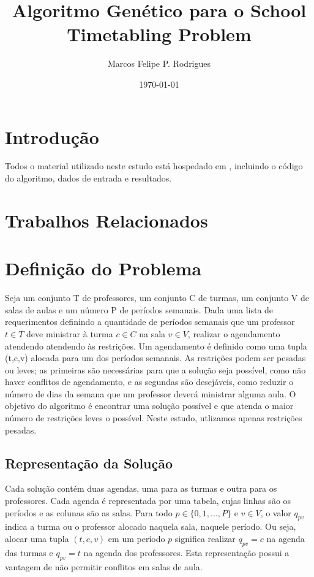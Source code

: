 \documentclass{article}
\title{Algoritmo Genético para o School Timetabling Problem}
\author{Marcos Felipe P. Rodrigues}
\date{\today}
\begin{document}
\maketitle
\text

\section{Introdução}
Todos o material utilizado neste estudo está hospedado em \cite{Github},
incluindo o código do algoritmo, dados de entrada e resultados.

\section{Trabalhos Relacionados}
\section{Definição do Problema}
Seja um conjunto T de professores, um conjunto C de turmas, um conjunto V de
salas de aulas e um número P de períodos semanais. Dada uma lista de
requerimentos definindo a quantidade de períodos semanais que um professor $ t\in T $ 
deve ministrar à turma $ c \in C $ na sala $ v \in V $, realizar o agendamento
atendendo atendendo às restrições. Um agendamento é definido como uma tupla
(t,c,v) alocada para um dos períodos semanais. As restrições podem ser pesadas
ou leves; as primeiras são necessárias para que a solução seja possível, como
não haver conflitos de agendamento, e as segundas são desejáveis, como reduzir o
número de dias da semana que um professor deverá ministrar alguma aula. O
objetivo do algoritmo é encontrar uma solução possível e que atenda o maior
número de restrições leves o possível. Neste estudo, utlizamos apenas restrições
pesadas.

  \subsection{Representação da Solução}
  Cada solução contém duas agendas, uma para as turmas e outra para os
  professores. Cada agenda é representada por uma tabela, cujas linhas são os
  períodos e as colunas são as salas. Para todo $ p \in \{0,1,...,P\} $ e 
  $ v \in V $, o valor $ q_{pv} $ indica a turma ou o professor alocado
  naquela sala, naquele período. Ou seja, alocar uma tupla $ (t,c,v) $ em um período
  $ p $ significa realizar $ q_{pv} = c $ na agenda das turmas e
  $ q_{pv} = t $ na agenda dos professores. Esta representação possui a
  vantagem de não permitir conflitos em salas de aula.
\end{document}
